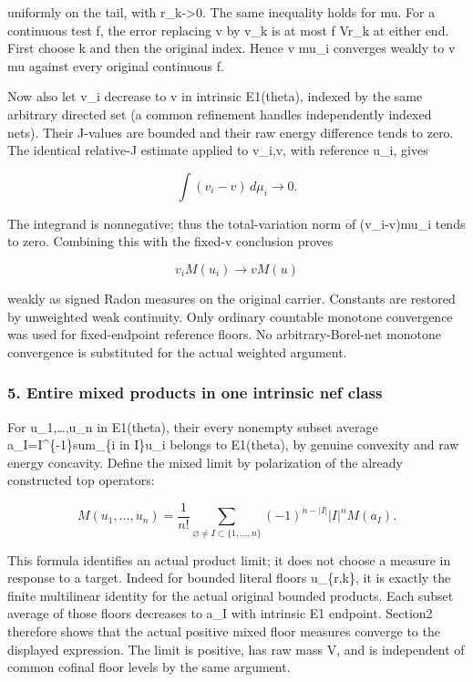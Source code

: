 \documentclass[
  10pt,
]{article}
\begin{document}
uniformly on the tail, with r\_k-\textgreater0. The same inequality
holds for mu. For a continuous test f, the error replacing v by v\_k is
at most \textbar\textbar f\textbar\textbar{} Vr\_k at either end. First
choose k and then the original index. Hence v mu\_i converges weakly to
v mu against every original continuous f.

Now also let v\_i decrease to v in intrinsic E1(theta), indexed by the
same arbitrary directed set (a common refinement handles independently
indexed nets). Their J-values are bounded and their raw energy
difference tends to zero. The identical relative-J estimate applied to
v\_i,v, with reference u\_i, gives

\[\int(v_i-v)\,d\mu_i\longrightarrow0.\]

The integrand is nonnegative; thus the total-variation norm of
(v\_i-v)mu\_i tends to zero. Combining this with the fixed-v conclusion
proves

\[v_i M(u_i)\longrightarrow vM(u)\]

weakly as signed Radon measures on the original carrier. Constants are
restored by unweighted weak continuity. Only ordinary countable monotone
convergence was used for fixed-endpoint reference floors. No
arbitrary-Borel-net monotone convergence is substituted for the actual
weighted argument.

\subsubsection{5. Entire mixed products in one intrinsic nef
class}\label{entire-mixed-products-in-one-intrinsic-nef-class}

For u\_1,\ldots,u\_n in E1(theta), their every nonempty subset average
a\_I=\textbar I\textbar\^{}\{-1\}sum\_\{i in I\}u\_i belongs to
E1(theta), by genuine convexity and raw energy concavity. Define the
mixed limit by polarization of the already constructed top operators:

\[M(u_1,\ldots,u_n)=\frac1{n!}
\sum_{\varnothing\ne I\subset\{1,\ldots,n\}}
(-1)^{n-|I|}|I|^nM(a_I).\]

This formula identifies an actual product limit; it does not choose a
measure in response to a target. Indeed for bounded literal floors
u\_\{r,k\}, it is exactly the finite multilinear identity for the actual
original bounded products. Each subset average of those floors decreases
to a\_I with intrinsic E1 endpoint. Section2 therefore shows that the
actual positive mixed floor measures converge to the displayed
expression. The limit is positive, has raw mass V, and is independent of
common cofinal floor levels by the same argument.
\end{document}
